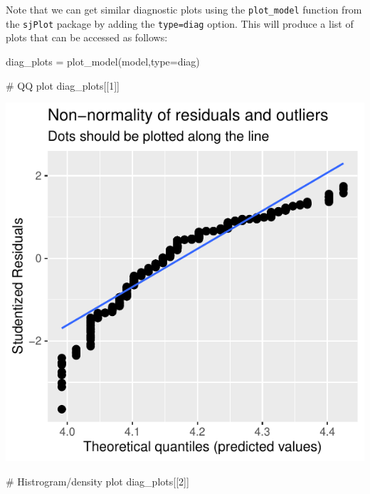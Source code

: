\documentclass[
  letterpaper,
  DIV=11,
  numbers=noendperiod]{scrartcl}
\newenvironment{Shaded}{\begin{snugshade}}{\end{snugshade}}
\newcommand{\AttributeTok}[1]{\textcolor[rgb]{0.40,0.45,0.13}{#1}}
\newcommand{\CommentTok}[1]{\textcolor[rgb]{0.37,0.37,0.37}{#1}}
\newcommand{\DecValTok}[1]{\textcolor[rgb]{0.68,0.00,0.00}{#1}}
\newcommand{\FunctionTok}[1]{\textcolor[rgb]{0.28,0.35,0.67}{#1}}
\newcommand{\NormalTok}[1]{\textcolor[rgb]{0.00,0.23,0.31}{#1}}
\newcommand{\OtherTok}[1]{\textcolor[rgb]{0.00,0.23,0.31}{#1}}
\newcommand{\StringTok}[1]{\textcolor[rgb]{0.13,0.47,0.30}{#1}}
\begin{document}
Note that we can get similar diagnostic plots using the
\texttt{plot\_model} function from the \texttt{sjPlot} package by adding
the \texttt{type=\textquotesingle{}diag\textquotesingle{}} option. This
will produce a list of plots that can be accessed as follows:

\begin{Shaded}
\begin{Highlighting}[]
\NormalTok{diag\_plots }\OtherTok{=} \FunctionTok{plot\_model}\NormalTok{(model,}\AttributeTok{type=}\StringTok{\textquotesingle{}diag\textquotesingle{}}\NormalTok{)}

\CommentTok{\# QQ plot}
\NormalTok{diag\_plots[[}\DecValTok{1}\NormalTok{]]}
\end{Highlighting}
\end{Shaded}

\begin{center}
\includegraphics{index_files/figure-pdf/unnamed-chunk-9-1.pdf}
\end{center}

\begin{Shaded}
\begin{Highlighting}[]
\CommentTok{\# Histrogram/density plot}
\NormalTok{diag\_plots[[}\DecValTok{2}\NormalTok{]]}
\end{Highlighting}
\end{Shaded}
\end{document}
